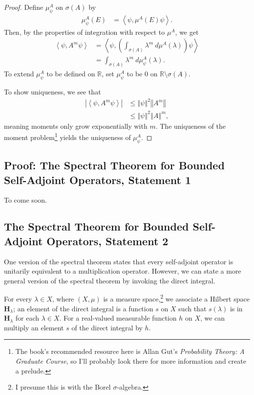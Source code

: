\documentclass[12pt]{extarticle}
\newcommand{\R}{\mathbb{R}}
\newcommand{\iprod}[2]{\left\langle #1,#2\right\rangle}
\newcommand{\norm}[1]{\left\Vert #1\right\Vert}
\theoremstyle{plain}
\theoremstyle{definition}
\theoremstyle{remark}
\renewcommand{\newline}{\hfill\break}
\begin{document}
  \begin{proof}
    Define $\mu^{A}_{\psi}$ on $\sigma(A)$ by
    \begin{align*}
      \mu^{A}_{\psi}(E) &= \iprod{\psi}{\mu^{A}(E)\psi}.
    \end{align*}
    Then, by the properties of integration with respect to $\mu^{A}$, we get
    \begin{align*}
      \iprod{\psi}{A^{m}\psi} &= \iprod{\psi}{\left(\int_{\sigma(A)}^{} \lambda^{m}\:d\mu^{A}(\lambda)\right)\psi}\\
                              &= \int_{\sigma(A)}^{} \lambda^{m}\:d\mu^{A}_{\psi}(\lambda).
    \end{align*}
    To extend $\mu^{A}_{\psi}$ to be defined on $\R$, set $\mu^{A}_{\psi}$ to be $0$ on $\R\setminus \sigma(A)$.\newline

    To show uniqueness, we see that
    \begin{align*}
      \left\vert \iprod{\psi}{A^{m}\psi} \right\vert &\leq \norm{\psi}^2\norm{A^{m}}\\
                                                     &\leq \norm{\psi}^2\norm{A}^{m},
    \end{align*}
    meaning moments only grow exponentially with $m$. The uniqueness of the moment problem\footnote{The book's recommended resource here is Allan Gut's \textit{Probability Theory: A Graduate Course}, so I'll probably look there for more information and create a prelude.} yields the uniqueness of $\mu^{A}_{\psi}$.
  \end{proof}
  \subsection{Proof: The Spectral Theorem for Bounded Self-Adjoint Operators, Statement 1}%
  To come soon.
  \subsection{The Spectral Theorem for Bounded Self-Adjoint Operators, Statement 2}%
  One version of the spectral theorem states that every self-adjoint operator is unitarily equivalent to a multiplication operator. However, we can state a more general version of the spectral theorem by invoking the direct integral.\newline

  For every $\lambda \in X$, where $(X,\mu)$ is a measure space,\footnote{I presume this is with the Borel $\sigma$-algebra.} we associate a Hilbert space $\mathbf{H}_{\lambda}$; an element of the direct integral is a function $s$ on $X$ such that $s(\lambda)$ is in $\mathbf{H}_{\lambda}$ for each $\lambda \in X$. For a real-valued measurable function $h$ on $X$, we can multiply an element $s$ of the direct integral by $h$.\newline
\end{document}

